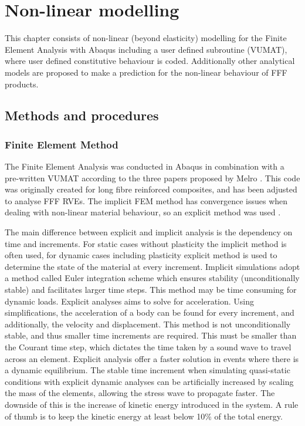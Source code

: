 \chapter{Non-linear modelling}
\label{chp:7}

This chapter consists of  non-linear (beyond elasticity) modelling for the Finite Element Analysis with Abaqus including a user defined subroutine (VUMAT), where user defined constitutive behaviour is coded. Additionally other analytical models are proposed to make a prediction for the non-linear behaviour of FFF products. 

\section{Methods and procedures}
\subsection{Finite Element Method}
The Finite Element Analysis was conducted in Abaqus in combination with a pre-written VUMAT according to the three papers proposed by Melro \cite{Melro2012InfluenceMaterials,Melro2013,Melro2013MicromechanicalModelling}. This code was originally created for long fibre reinforced composites, and has been adjusted to analyse FFF RVEs. The implicit FEM method has convergence issues when dealing with non-linear material behaviour, so an explicit method was used \cite{Harish2019ImplicitMethod}.

The main difference between explicit and implicit analysis is the dependency on time and increments. For static cases without plasticity the implicit method is often used, for dynamic cases including plasticity explicit method is used to determine the state of the material at every increment. Implicit simulations adopt a method called Euler integration scheme which ensures stability (unconditionally stable) and facilitates larger time steps. This method may be time consuming for dynamic loads.  Explicit analyses aims to solve for acceleration. Using simplifications, the acceleration of a body can be found for every increment, and additionally, the velocity and displacement. This method is not unconditionally stable, and thus smaller time increments are required. This must be smaller than the Courant time step, which dictates the time taken by a sound wave to travel across an element. Explicit analysis offer a faster solution in events where there is a dynamic equilibrium.  The stable time increment when simulating quasi-static conditions with explicit dynamic analyses can be artificially increased by scaling the mass of the elements, allowing the stress wave to propagate faster. The downside of this is the increase of kinetic energy introduced in the system. A rule of thumb is to keep the kinetic energy at least below 10\% of the total energy.  


